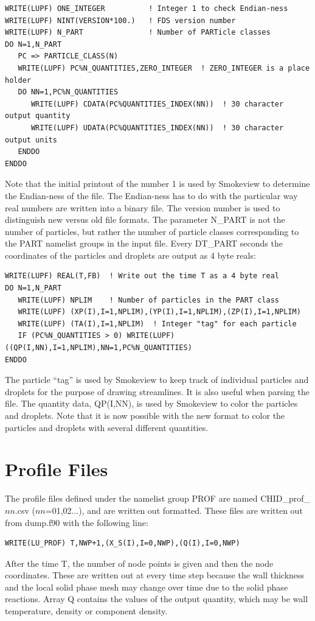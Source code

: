\documentclass[11pt]{book}
\begin{document}
\begin{lstlisting}
WRITE(LUPF) ONE_INTEGER          ! Integer 1 to check Endian-ness
WRITE(LUPF) NINT(VERSION*100.)   ! FDS version number
WRITE(LUPF) N_PART               ! Number of PARTicle classes
DO N=1,N_PART
   PC => PARTICLE_CLASS(N)
   WRITE(LUPF) PC%N_QUANTITIES,ZERO_INTEGER  ! ZERO_INTEGER is a place holder
   DO NN=1,PC%N_QUANTITIES
      WRITE(LUPF) CDATA(PC%QUANTITIES_INDEX(NN))  ! 30 character output quantity
      WRITE(LUPF) UDATA(PC%QUANTITIES_INDEX(NN))  ! 30 character output units
   ENDDO
ENDDO
\end{lstlisting}
Note that the initial printout of the number 1 is used by Smokeview to determine the
Endian-ness of the file. The Endian-ness has to do with the particular way real numbers are written into a binary file.
The version number is used to distinguish new versus old file formats.
The parameter {\ct N\_PART} is not the number of particles, but rather the number of
particle classes corresponding to the {\ct PART} namelist groups in the input file.
Every {\ct DT\_PART} seconds the coordinates of the particles and droplets are output as 4 byte reals:

\begin{lstlisting}
WRITE(LUPF) REAL(T,FB)  ! Write out the time T as a 4 byte real
DO N=1,N_PART
   WRITE(LUPF) NPLIM    ! Number of particles in the PART class
   WRITE(LUPF) (XP(I),I=1,NPLIM),(YP(I),I=1,NPLIM),(ZP(I),I=1,NPLIM)
   WRITE(LUPF) (TA(I),I=1,NPLIM)  ! Integer "tag" for each particle
   IF (PC%N_QUANTITIES > 0) WRITE(LUPF) ((QP(I,NN),I=1,NPLIM),NN=1,PC%N_QUANTITIES)
ENDDO
\end{lstlisting}
The particle ``tag'' is used by Smokeview to keep track of individual particles and droplets for the purpose of drawing
streamlines. It is also useful when parsing the file. The quantity data, {\ct QP(I,NN)}, is used by Smokeview to color
the particles and droplets. Note that it is now possible with the new format to color the particles and droplets with
several different quantities.

\section{Profile Files}
\label{out:PROF}

The profile files defined under the namelist group {\ct PROF} are named {\ct CHID\_prof\_$nn$.csv} ($nn$=01,02...), and are written out formatted. These files are written out from {\ct dump.f90} with the following line:
\begin{lstlisting}
WRITE(LU_PROF) T,NWP+1,(X_S(I),I=0,NWP),(Q(I),I=0,NWP)
\end{lstlisting}
After the time {\ct T}, the number of node points is given and then the node coordinates. These are written out at every time step because the wall thickness and the local solid phase mesh may change over time due to the solid phase reactions. Array {\ct Q} contains the values of the output quantity, which may be wall temperature, density or component density.
\end{document}
